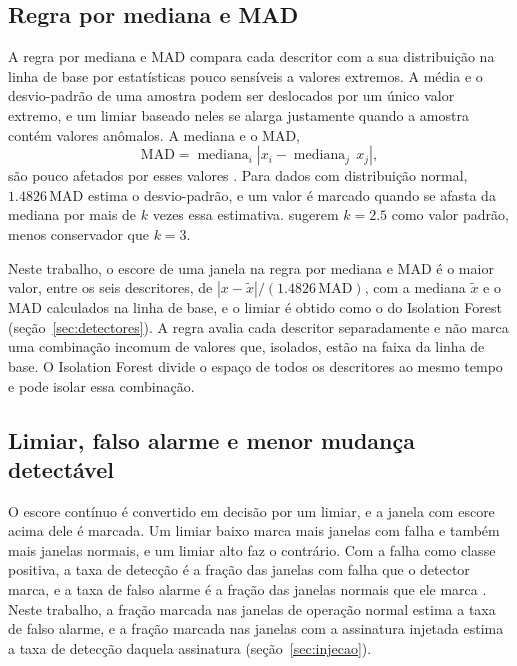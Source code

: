 \subsection{Regra por mediana e MAD}\label{sec:fund-mad}

A regra por mediana e MAD compara cada descritor com a sua distribuição na linha de base por estatísticas pouco sensíveis a valores extremos. A média e o desvio-padrão de uma amostra podem ser deslocados por um único valor extremo, e um limiar baseado neles se alarga justamente quando a amostra contém valores anômalos. A mediana e o MAD,
\begin{equation}
\mathrm{MAD} = \operatorname{mediana}_i \left| x_i - \operatorname{mediana}_j\, x_j \right|,
\label{eq:fund-mad}
\end{equation}
são pouco afetados por esses valores \cite{leys2013}. Para dados com distribuição normal, $\num{1,4826}\,\mathrm{MAD}$ estima o desvio-padrão, e um valor é marcado quando se afasta da mediana por mais de $k$ vezes essa estimativa.  sugerem $k = \num{2,5}$ como valor padrão, menos conservador que $k = 3$.

Neste trabalho, o escore de uma janela na regra por mediana e MAD é o maior valor, entre os seis descritores, de $|x - \tilde{x}|/(\num{1,4826}\,\mathrm{MAD})$, com a mediana $\tilde{x}$ e o MAD calculados na linha de base, e o limiar é obtido como o do Isolation Forest (seção~\ref{sec:detectores}). A regra avalia cada descritor separadamente e não marca uma combinação incomum de valores que, isolados, estão na faixa da linha de base. O Isolation Forest divide o espaço de todos os descritores ao mesmo tempo e pode isolar essa combinação.

\subsection{Limiar, falso alarme e menor mudança detectável}\label{sec:fund-limiar}

O escore contínuo é convertido em decisão por um limiar, e a janela com escore acima dele é marcada. Um limiar baixo marca mais janelas com falha e também mais janelas normais, e um limiar alto faz o contrário. Com a falha como classe positiva, a taxa de detecção é a fração das janelas com falha que o detector marca, e a taxa de falso alarme é a fração das janelas normais que ele marca \cite{fawcett2006}. Neste trabalho, a fração marcada nas janelas de operação normal estima a taxa de falso alarme, e a fração marcada nas janelas com a assinatura injetada estima a taxa de detecção daquela assinatura (seção~\ref{sec:injecao}).

